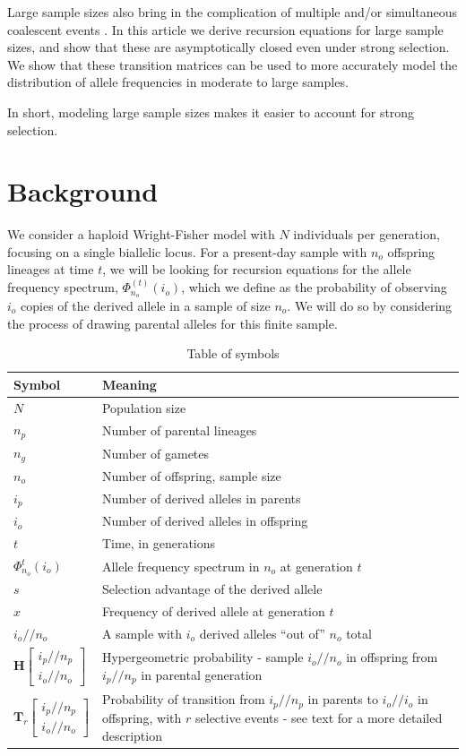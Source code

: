 \documentclass[review]{elsarticle}
\newcommand{\afs}[2]{\Phi_{#1}^{(#2)}}
\newcommand{\dslash}{/\!\!/}
\newcommand{\Coalc}[4]{\begin{bmatrix}#1\dslash #2 \\ #3\dslash #4 \end{bmatrix}}
\begin{document}
Large sample sizes also bring in the complication of multiple and/or simultaneous coalescent events
\citep{BhaskarEtAl2014}. In this article we derive recursion equations for large sample sizes, and
show that these are asymptotically closed even under strong selection. We show that these transition
matrices can be used to more accurately model the distribution of allele frequencies in moderate to
large samples.

In short, modeling large sample sizes makes it easier to account for strong selection. 

\section{Background}
\label{sec:background}

We consider a haploid Wright-Fisher model with $N$ individuals per generation, focusing on a single
biallelic locus. For a present-day sample with $n_o$ offspring lineages at time $t$, we will be
looking for recursion equations for the allele frequency spectrum, $\afs{n_o}{t}(i_o)$, which we
define as the probability of observing $i_o$ copies of the derived allele in a sample of size $n_o$.
We will do so by considering the process of drawing parental alleles for this finite sample.

\begin{table}
  \centering
  \begin{tabular}{l|p{100mm}}
    Symbol & Meaning\\
    \hline
    $N$ & Population size\\
    $n_p$ & Number of parental lineages\\
    $n_g$ & Number of gametes\\
    $n_o$ & Number of offspring, sample size\\
    $i_p$ & Number of derived alleles in parents\\
    $i_o$ & Number of derived alleles in offspring\\
    $t$ & Time, in generations\\
    $\Phi_{n_o}^{t}(i_o)$ & Allele frequency spectrum in $n_o$ at generation $t$\\
    $s$ & Selection advantage of the derived allele\\
    $x$ & Frequency of derived allele at generation $t$\\
    $i_o \dslash n_o$ & A sample with $i_o$ derived alleles ``out of'' $n_o$ total\\
    $\mathbf{H}\Coalc{i_p}{n_p}{i_o}{n_o}$ & Hypergeometric probability -
                                             sample $i_o \dslash n_o$ in offspring from $i_p \dslash n_p$ in parental generation\\
    $\mathbf{T}_{r}\Coalc{i_p}{n_p}{i_o}{n_o}$ & Probability of transition from $i_p \dslash n_p$ in parents
                                                 to $i_o \dslash i_o$ in offspring, with $r$ selective events -
                                                 see text for a more detailed description\\
  \end{tabular}
  \caption{\label{tab:symbols} Table of symbols}
\end{table}
\end{document}
